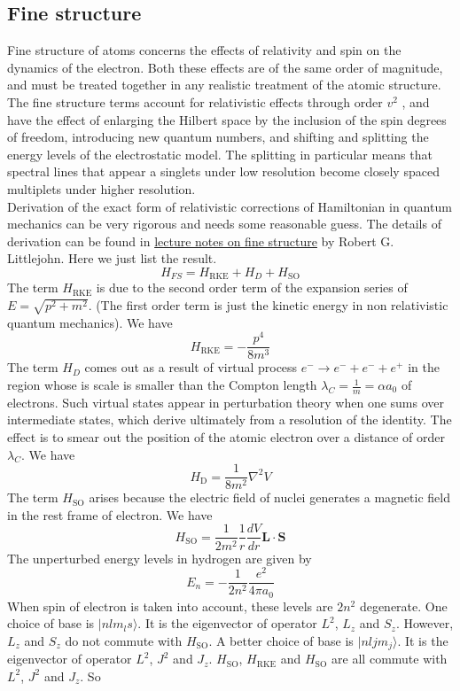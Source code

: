 \subsection{Fine structure}
Fine structure of atoms concerns the effects of relativity and spin on the dynamics of the electron. Both these effects are of the same order of magnitude, and must be treated together in any realistic treatment of the atomic structure.\\
The fine structure terms account for relativistic effects through order $v^2$ , and have the effect of enlarging the Hilbert space by the inclusion of the spin degrees of freedom, introducing new quantum numbers, and shifting and splitting the energy levels of the electrostatic model. 
The splitting in particular means that spectral lines that appear a singlets under low resolution become closely spaced multiplets under higher resolution.\\
Derivation of the exact form of relativistic corrections of Hamiltonian in quantum mechanics can be very rigorous and needs some reasonable guess. The details of derivation can be found in 
\href{http://bohr.physics.berkeley.edu/classes/221/1112/notes/finestruc.pdf}{lecture notes on fine structure} by Robert G. Littlejohn. Here we just list the result.
\[H_{FS} = H_{\mathrm{RKE}} + H_{D} + H_{\mathrm{SO}}\]
The term $H_{\mathrm{RKE}}$ is due to the second order term of the expansion series of $E = \sqrt{p^2+m^2}$. (The first order term is just the kinetic energy in non relativistic quantum mechanics). We have
\[H_{\mathrm{RKE}} = - \frac{p^4}{8m^3}\]
The term $H_{D}$ comes out as a result of virtual process $e^{-} \to e^{-} + e^{-} + e^{+}$ in the region whose is scale is smaller than the Compton length $\lambda_C = \frac{1}{m} = \alpha a_0$ of electrons. Such virtual states appear in perturbation theory when one sums over intermediate states, which derive ultimately from a resolution of the identity. The effect is to smear out the position of the atomic electron
over a distance of order $\lambda_C$. We have
\[H_{\mathrm{D}} = \frac{1}{8m^2} \nabla^2 V\]
The term $H_{\mathrm{SO}}$ arises because the electric field of nuclei generates a magnetic field in the rest frame of electron. We have
\[H_{\mathrm{SO}} = \frac{1}{2m^2} \frac{1}{r} \frac{dV}{dr} \bm{L}\cdot\bm{S}\]
The unperturbed energy levels in hydrogen are given by
\[E_n = -\frac{1}{2n^2} \frac{e^2}{4\pi a_0}\]
When spin of electron is taken into account,  these levels are $2n^2$ degenerate. One choice of base is $|nlm_{l}s\rangle$. It is the eigenvector of operator $L^2$, $L_z$ and $S_z$. However, $L_z$ and $S_z$ do not commute with $H_{\mathrm{SO}}$. A better choice of base is $|nljm_j\rangle$. It is the eigenvector of operator $L^2$, $J^2$ and $J_z$. $H_{\mathrm{SO}}$, $H_{\mathrm{RKE}}$ and $H_{\mathrm{SO}}$ are all commute with $L^2$, $J^2$ and $J_z$. So
